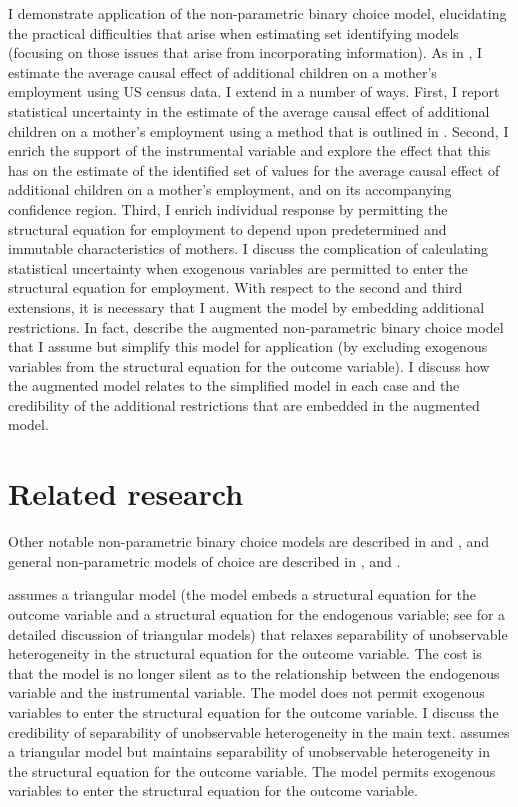 \documentclass[12pt,a4paper,twoside]{article}
\numberwithin{equation}{section}
\begin{document}
I demonstrate application of the non-parametric binary choice model, elucidating the practical difficulties that arise when estimating set identifying models (focusing on those issues that arise from incorporating information). As in \cite{cr13}, I estimate the average causal effect of additional children on a mother's employment using US census data. I extend \cite{cr13} in a number of ways. First, I report statistical uncertainty in the estimate of the average causal effect of additional children on a mother's employment using a method that is outlined in \cite{cHlr13}. Second, I enrich the support of the instrumental variable and explore the effect that this has on the estimate of the identified set of values for the average causal effect of additional children on a mother's employment, and on its accompanying confidence region. Third, I enrich individual response by permitting the structural equation for employment to depend upon predetermined and immutable characteristics of mothers. I discuss the complication of calculating statistical uncertainty when exogenous variables are permitted to enter the structural equation for employment. With respect to the second and third extensions, it is necessary that I augment the model by embedding additional restrictions. In fact, \cite{cr13} describe the augmented non-parametric binary choice model that I assume but simplify this model for application (by excluding exogenous variables from the structural equation for the outcome variable). I discuss how the augmented model relates to the simplified model in each case and the credibility of the additional restrictions that are embedded in the augmented model.
\section*{Related research}
Other notable non-parametric binary choice models are described in \cite{bp97} and \cite{sHvY11}, and general non-parametric models of choice are described in \cite{c05}, \cite{kI09} and \cite{c10}.

\cite{bp97} assumes a triangular model (the model embeds a structural equation for the outcome variable and a structural equation for the endogenous variable; see \cite{sTw60} for a detailed discussion of triangular models) that relaxes separability of unobservable heterogeneity in the structural equation for the outcome variable. The cost is that the model is no longer silent as to the relationship between the endogenous variable and the instrumental variable. The model does not permit exogenous variables to enter the structural equation for the outcome variable. I discuss the credibility of separability of unobservable heterogeneity in the main text. \cite{sHvY11} assumes a triangular model but maintains separability of unobservable heterogeneity in the structural equation for the outcome variable. The model permits exogenous variables to enter the structural equation for the outcome variable.
\end{document}
